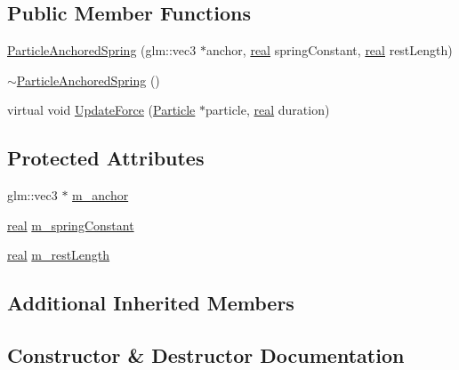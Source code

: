 \subsection*{Public Member Functions}
\begin{DoxyCompactItemize}
\item 
\hyperlink{classrum_1_1_particle_anchored_spring_af0057780e9cc36a2c3e80d5d2ced533b}{Particle\+Anchored\+Spring} (glm\+::vec3 $\ast$anchor, \hyperlink{namespacerum_a7e8cca23573d5eaead0f138cbaa4862c}{real} spring\+Constant, \hyperlink{namespacerum_a7e8cca23573d5eaead0f138cbaa4862c}{real} rest\+Length)
\item 
\hyperlink{classrum_1_1_particle_anchored_spring_a590f7f2dbb306ba4ac5cb7963c8dbf22}{$\sim$\+Particle\+Anchored\+Spring} ()
\item 
virtual void \hyperlink{classrum_1_1_particle_anchored_spring_aa4fcab6f3de51c6b89f3a65b80814cc6}{Update\+Force} (\hyperlink{classrum_1_1_particle}{Particle} $\ast$particle, \hyperlink{namespacerum_a7e8cca23573d5eaead0f138cbaa4862c}{real} duration)
\end{DoxyCompactItemize}
\subsection*{Protected Attributes}
\begin{DoxyCompactItemize}
\item 
glm\+::vec3 $\ast$ \hyperlink{classrum_1_1_particle_anchored_spring_a33813234e4924860ce0f5ee29efd5c96}{m\+\_\+anchor}
\item 
\hyperlink{namespacerum_a7e8cca23573d5eaead0f138cbaa4862c}{real} \hyperlink{classrum_1_1_particle_anchored_spring_a1f5b5cc0af0815b1d7d9902c515f9ed8}{m\+\_\+spring\+Constant}
\item 
\hyperlink{namespacerum_a7e8cca23573d5eaead0f138cbaa4862c}{real} \hyperlink{classrum_1_1_particle_anchored_spring_ae0b4ab273dfd453b9e871ec1371d8ab8}{m\+\_\+rest\+Length}
\end{DoxyCompactItemize}
\subsection*{Additional Inherited Members}


\subsection{Constructor \& Destructor Documentation}
\mbox{\label{classrum_1_1_particle_anchored_spring_af0057780e9cc36a2c3e80d5d2ced533b}} 
